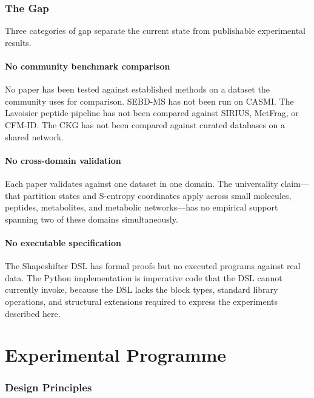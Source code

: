 \documentclass[11pt,a4paper]{article}
\theoremstyle{planstyle}
\theoremstyle{definition}
\theoremstyle{remark}
\begin{document}
\section{The Gap}
\label{sec:gap}

Three categories of gap separate the current state from publishable
experimental results.

\subsection{No community benchmark comparison}

No paper has been tested against established methods on a dataset the
community uses for comparison. SEBD-MS has not been run on CASMI.
The Lavoisier peptide pipeline has not been compared against SIRIUS,
MetFrag, or CFM-ID. The CKG has not been compared against curated
databases on a shared network.

\subsection{No cross-domain validation}

Each paper validates against one dataset in one domain. The
universality claim---that partition states and S-entropy coordinates
apply across small molecules, peptides, metabolites, and metabolic
networks---has no empirical support spanning two of these domains
simultaneously.

\subsection{No executable specification}

The Shapeshifter DSL has formal proofs but no executed programs against
real data. The Python implementation is imperative code that the DSL
cannot currently invoke, because the DSL lacks the block types, standard
library operations, and structural extensions required to express the
experiments described here.

\part{Experimental Programme}

\section{Design Principles}
\label{sec:principles}
\end{document}
